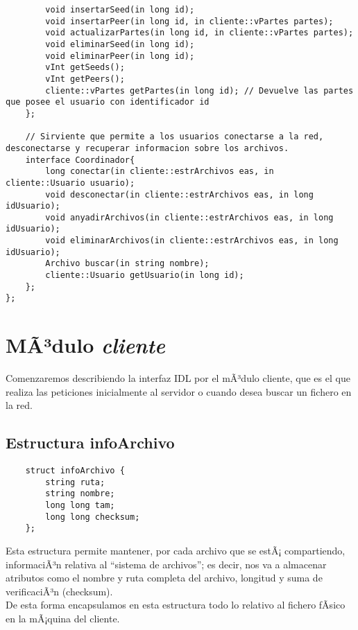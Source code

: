 \begin{verbatim}
		void insertarSeed(in long id);
		void insertarPeer(in long id, in cliente::vPartes partes);
		void actualizarPartes(in long id, in cliente::vPartes partes);
		void eliminarSeed(in long id);
		void eliminarPeer(in long id);
		vInt getSeeds();
		vInt getPeers();
		cliente::vPartes getPartes(in long id); // Devuelve las partes que posee el usuario con identificador id
	};

	// Sirviente que permite a los usuarios conectarse a la red, desconectarse y recuperar informacion sobre los archivos.
	interface Coordinador{
		long conectar(in cliente::estrArchivos eas, in cliente::Usuario usuario);
		void desconectar(in cliente::estrArchivos eas, in long idUsuario);
		void anyadirArchivos(in cliente::estrArchivos eas, in long idUsuario);
		void eliminarArchivos(in cliente::estrArchivos eas, in long idUsuario);
		Archivo buscar(in string nombre);
		cliente::Usuario getUsuario(in long id);
	};
};
\end{verbatim}


   \section{MÃ³dulo \textit{cliente}}
   Comenzaremos describiendo la interfaz IDL por el mÃ³dulo cliente, que es el que realiza las peticiones inicialmente al servidor o cuando desea buscar un
   fichero en la red.\\      

      \subsection{Estructura infoArchivo}
      \begin{center}
         \begin{verbatim}
	struct infoArchivo {
		string ruta;
		string nombre;
		long long tam;
		long long checksum;
	};
         \end{verbatim}
      \end{center}
      Esta estructura permite mantener, por cada archivo que se estÃ¡ compartiendo, informaciÃ³n relativa al ``sistema de archivos''; es decir, nos
      va a almacenar atributos como el nombre y ruta completa del archivo, longitud y suma de verificaciÃ³n (checksum).\\ 
      De esta forma encapsulamos en esta estructura todo lo relativo al fichero fÃ­sico en la mÃ¡quina del cliente.\\

